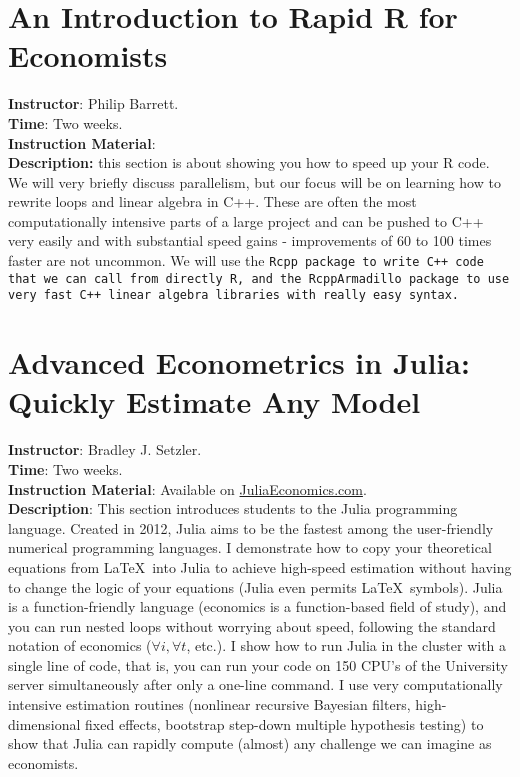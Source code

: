 \section{An Introduction to Rapid R for Economists}
\noindent \textbf{Instructor}: Philip Barrett.\\
\noindent \textbf{Time}: Two weeks.\\
\noindent \textbf{Instruction Material}: \\
\noindent \textbf{Description:} this section is about showing you how to speed up your R code.  We will very briefly discuss parallelism, but our focus will be on learning how to rewrite loops and linear algebra in C++.  These are often the most computationally intensive parts of a large project and can be pushed to C++ very easily and with substantial speed gains - improvements of 60 to 100 times faster are not uncommon.  We will use the \tt Rcpp \rm package to write C++ code that we can call from directly R, and the \tt RcppArmadillo \rm package to use very fast C++ linear algebra libraries with really easy syntax.


\section{Advanced Econometrics in Julia: Quickly Estimate Any Model}
\noindent \textbf{Instructor}: Bradley J. Setzler.\\
\noindent \textbf{Time}: Two weeks.\\
\noindent \textbf{Instruction Material}: Available on \href{JuliaEconomics.com}{JuliaEconomics.com}.\\
\noindent \textbf{Description}: This section introduces students to the Julia programming language. Created in 2012, Julia aims to be the fastest among the user-friendly numerical programming languages. I demonstrate how to copy your theoretical equations from \LaTeX\ into Julia to achieve high-speed estimation without having to change the logic of your equations (Julia even permits \LaTeX\ symbols). Julia is a function-friendly language (economics is a function-based field of study), and you can run nested loops without worrying about speed, following the standard notation of economics ($\forall i, \forall t$, etc.). I show how to run Julia in the cluster with a single line of code, that is, you can run your code on 150 CPU's of the University server simultaneously after only a one-line command. I use very computationally intensive estimation routines (nonlinear recursive Bayesian filters, high-dimensional fixed effects, bootstrap step-down multiple hypothesis testing) to show that Julia can rapidly compute (almost) any challenge we can imagine as economists.


